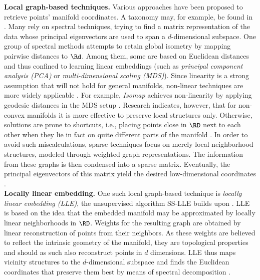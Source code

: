 \textbf{Local graph-based techniques.}
Various approaches have been proposed to retrieve points' manifold coordinates.
A taxonomy may, for example, be found in \citet{vandermaatenetal2009}. 
Many rely on spectral techniques, trying to find a matrix representation of the 
data whose principal eigenvectors are used to span a $d$-dimensional subspace.
One group of spectral methods attempts to retain global isometry by mapping 
pairwise distances to $\Rd$.
Among them, some are based on Euclidean distances and thus confined to 
learning linear embeddings (such as \textit{principal component analysis (PCA)} 
or \textit{multi-dimensional scaling (MDS)}).
Since linearity is a strong assumption that will not hold for general manifolds, 
non-linear techniques are more widely applicable \citep{vandermaatenetal2009}.
For example, \textit{Isomap} achieves non-linearity by applying geodesic 
distances in the MDS setup \citep{tenenbaumdesilvalangford2000}.
Research indicates, however, that for non-convex manifolds it is more effective 
to preserve local structures only.
Otherwise, solutions are prone to shortcuts, i.e., placing points close in $\RD$
next to each other when they lie in fact on quite different parts of the 
manifold \citep{belkinniyogi2003}.
In order to avoid such miscalculations, sparse techniques focus on merely 
local neighborhood structures, modeled through weighted graph representations.
The information from these graphs is then condensed into a sparse matrix. 
Eventually, the principal eigenvectors of this matrix yield the desired 
low-dimensional coordinates \citep{vandermaatenetal2009}.
\\

\textbf{Locally linear embedding.}
One such local graph-based technique is \textit{locally linear embedding (LLE)}, 
the unsupervised algorithm SS-LLE builds upon \citep{roweissaul2000}.
LLE is based on the idea that the embedded manifold may be approximated by 
locally linear neighborhoods in $\RD$.
Weights for the resulting graph are obtained by linear reconstruction of points 
from their neighbors. 
As these weights are believed to reflect the intrinsic geometry of the manifold, 
they are topological properties and should as such also reconstruct points in 
$d$ dimensions.
LLE thus maps vicinity structures to the $d$-dimensional subspace and finds the 
Euclidean coordinates that preserve them best by means of spectral decomposition \citep{roweissaul2000}.

